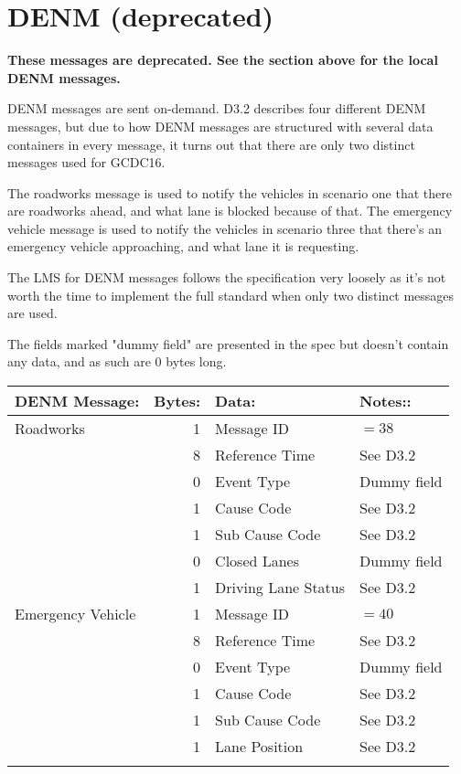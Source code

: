 \documentclass[11pt]{article}
\begin{document}
\section{DENM (deprecated)}
\label{sec:orgheadline4}
\textbf{These messages are deprecated. See the section above for the local}
\textbf{DENM messages.}

DENM messages are sent on-demand. D3.2 describes four different DENM
messages, but due to how DENM messages are structured with several
data containers in every message, it turns out that there are only two
distinct messages used for GCDC16.

The roadworks message is used to notify the vehicles in scenario one that
there are roadworks ahead, and what lane is blocked because of that.
The emergency vehicle message is used to notify the vehicles in scenario three
that there's an emergency vehicle approaching, and what lane it is
requesting.

The LMS for DENM messages follows the specification very loosely as
it's not worth the time to implement the full standard when only two
distinct messages are used. 

The fields marked "dummy field" are presented in the spec but doesn't
contain any data, and as such are 0 bytes long.

\begin{center}
\begin{tabular}{lrll}
\hline
DENM Message: & Bytes: & Data: & Notes::\\
\hline
Roadworks & 1 & Message ID & \(=38\)\\
 & 8 & Reference Time & See D3.2\\
 & 0 & Event Type & Dummy field\\
 & 1 & Cause Code & See D3.2\\
 & 1 & Sub Cause Code & See D3.2\\
 & 0 & Closed Lanes & Dummy field\\
 & 1 & Driving Lane Status & See D3.2\\
\hline
Emergency Vehicle & 1 & Message ID & \(=40\)\\
 & 8 & Reference Time & See D3.2\\
 & 0 & Event Type & Dummy field\\
 & 1 & Cause Code & See D3.2\\
 & 1 & Sub Cause Code & See D3.2\\
 & 1 & Lane Position & See D3.2\\
 &  &  & \\
\end{tabular}
\end{center}
\end{document}
